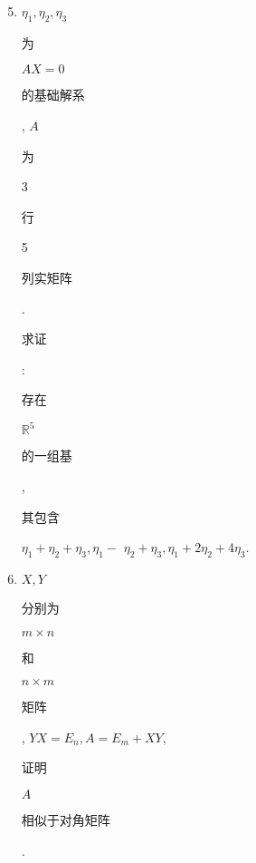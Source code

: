 \documentclass[10pt]{article}
\begin{document}
\begin{enumerate}
  \setcounter{enumi}{4}
  \item $\eta_{1}, \eta_{2}, \eta_{3}$ \begin{CJK}{UTF8}{mj}为\end{CJK} $A X=0$ \begin{CJK}{UTF8}{mj}的基础解系\end{CJK}, $A$ \begin{CJK}{UTF8}{mj}为\end{CJK} 3 \begin{CJK}{UTF8}{mj}行\end{CJK} 5 \begin{CJK}{UTF8}{mj}列实矩阵\end{CJK}. \begin{CJK}{UTF8}{mj}求证\end{CJK}: \begin{CJK}{UTF8}{mj}存在\end{CJK} $\mathbb{R}^{5}$ \begin{CJK}{UTF8}{mj}的一组基\end{CJK}, \begin{CJK}{UTF8}{mj}其包含\end{CJK} $\eta_{1}+\eta_{2}+\eta_{3}, \eta_{1}-$ $\eta_{2}+\eta_{3}, \eta_{1}+2 \eta_{2}+4 \eta_{3} .$

  \item $X, Y$ \begin{CJK}{UTF8}{mj}分别为\end{CJK} $m \times n$ \begin{CJK}{UTF8}{mj}和\end{CJK} $n \times m$ \begin{CJK}{UTF8}{mj}矩阵\end{CJK}, $Y X=E_{n}, A=E_{m}+X Y$, \begin{CJK}{UTF8}{mj}证明\end{CJK} $A$ \begin{CJK}{UTF8}{mj}相似于对角矩阵\end{CJK}.


\end{enumerate}
\end{document}
